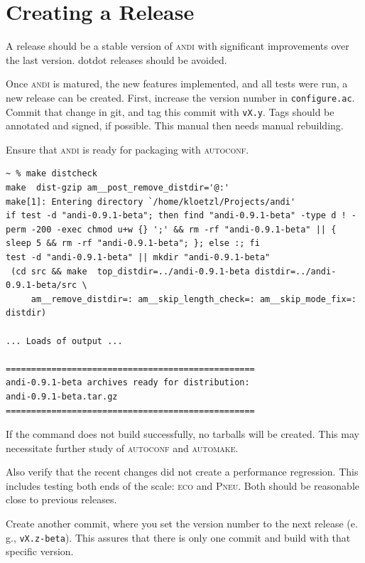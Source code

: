 \documentclass[a4paper,
  10pt,
  english,
  DIV=12,
  BCOR=8mm]{scrbook}
\newcommand{\algo}[1]{\textsc{{#1}}}
\newcommand{\andi}{\algo{andi}\xspace}
\newcommand{\eco}{\textsc{eco}\oldstylenums{29}\xspace}
\newcommand{\pneu}{\textsc{Pneu}\oldstylenums{3085}\xspace}
\begin{document}
\section{Creating a Release}

A release should be a stable version of \andi with significant improvements over the last version. dotdot releases should be avoided.


Once \andi is matured, the new features implemented, and all tests were run, a new release can be created. First, increase the version number in \lstinline$configure.ac$. Commit that change in git, and tag this commit with \lstinline$vX.y$. Tags should be annotated and signed, if possible. This manual then needs manual rebuilding.

Ensure that \andi is ready for packaging with \algo{autoconf}.

\begin{lstlisting}
~ % make distcheck
make  dist-gzip am__post_remove_distdir='@:'
make[1]: Entering directory `/home/kloetzl/Projects/andi'
if test -d "andi-0.9.1-beta"; then find "andi-0.9.1-beta" -type d ! -perm -200 -exec chmod u+w {} ';' && rm -rf "andi-0.9.1-beta" || { sleep 5 && rm -rf "andi-0.9.1-beta"; }; else :; fi
test -d "andi-0.9.1-beta" || mkdir "andi-0.9.1-beta"
 (cd src && make  top_distdir=../andi-0.9.1-beta distdir=../andi-0.9.1-beta/src \
     am__remove_distdir=: am__skip_length_check=: am__skip_mode_fix=: distdir)

... Loads of output ...

=================================================
andi-0.9.1-beta archives ready for distribution: 
andi-0.9.1-beta.tar.gz
=================================================
\end{lstlisting}

If the command does not build successfully, no tarballs will be created. This may necessitate further study of \algo{autoconf} and \algo{automake}.

Also verify that the recent changes did not create a performance regression. This includes testing both ends of the scale: \eco and \pneu. Both should be reasonable close to previous releases.

Create another commit, where you set the version number to the next release (e.\,g., \lstinline$vX.z-beta$). This assures that there is only one commit and build with that specific version.

\backmatter

\end{document}

